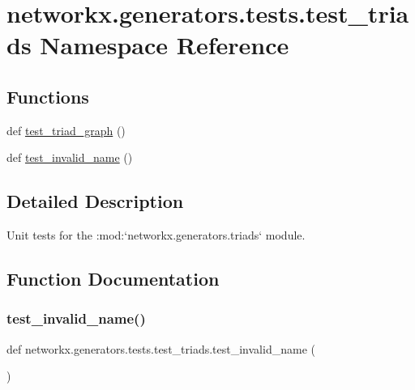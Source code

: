 \hypertarget{namespacenetworkx_1_1generators_1_1tests_1_1test__triads}{}\section{networkx.\+generators.\+tests.\+test\+\_\+triads Namespace Reference}
\label{namespacenetworkx_1_1generators_1_1tests_1_1test__triads}
\subsection*{Functions}
\begin{DoxyCompactItemize}
\item 
def \hyperlink{namespacenetworkx_1_1generators_1_1tests_1_1test__triads_a29e9e28ee5a59144727839cccb1d4e93}{test\+\_\+triad\+\_\+graph} ()
\item 
def \hyperlink{namespacenetworkx_1_1generators_1_1tests_1_1test__triads_a21bef3c269b217f5148afc6bb59dfddf}{test\+\_\+invalid\+\_\+name} ()
\end{DoxyCompactItemize}


\subsection{Detailed Description}
\begin{DoxyVerb}Unit tests for the :mod:`networkx.generators.triads` module.\end{DoxyVerb}
 

\subsection{Function Documentation}
\mbox{\label{namespacenetworkx_1_1generators_1_1tests_1_1test__triads_a21bef3c269b217f5148afc6bb59dfddf}} 
\subsubsection{\texorpdfstring{test\+\_\+invalid\+\_\+name()}{test\_invalid\_name()}}
{\footnotesize\ttfamily def networkx.\+generators.\+tests.\+test\+\_\+triads.\+test\+\_\+invalid\+\_\+name (\begin{DoxyParamCaption}{ }\end{DoxyParamCaption})}

